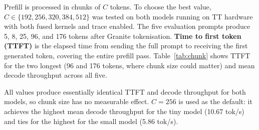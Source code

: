 Prefill is processed in chunks of $C$ tokens. To choose the best value, $C \in \{192, 256, 320, 384, 512\}$ was tested on both models running on TT hardware with both fused kernels and trace enabled. The five evaluation prompts produce 5, 8, 25, 96, and 176 tokens after Granite tokenisation. \textbf{Time to first token (TTFT)} is the elapsed time from sending the full prompt to receiving the first generated token, covering the entire prefill pass. Table~\ref{tab:chunk} shows TTFT for the two longest (96 and 176 tokens, where chunk size could matter) and mean decode throughput across all five.

\begin{table}[h]
\caption{Effect of prefill chunk size on TTFT and decode throughput (TT hardware, both fused kernels and trace enabled).}
\label{tab:chunk}
\end{table}

All values produce essentially identical TTFT and decode throughput for both models, so chunk size has no measurable effect. $C{=}256$ is used as the default: it achieves the highest mean decode throughput for the tiny model (10.67 tok/s) and ties for the highest for the small model (5.86 tok/s).
